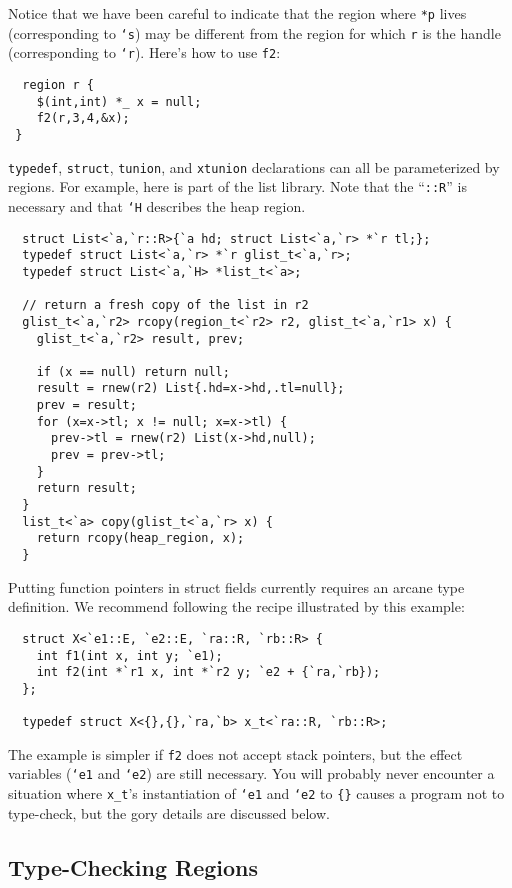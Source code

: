 Notice that we have been careful to indicate that the region where
\texttt{*p} lives (corresponding to \texttt{`s}) may be different from
the region for which \texttt{r} is the handle (corresponding to
\texttt{`r}).  Here's how to use \texttt{f2}:
\begin{verbatim}
  region r { 
    $(int,int) *_ x = null; 
    f2(r,3,4,&x);
 }
\end{verbatim} %

\texttt{typedef}, \texttt{struct}, \texttt{tunion}, and
\texttt{xtunion} declarations can all be parameterized by regions.
For example, here is part of the list library.  Note that the
``\texttt{::R}'' is necessary and that \texttt{`H} describes the heap
region.
\begin{verbatim}
  struct List<`a,`r::R>{`a hd; struct List<`a,`r> *`r tl;};
  typedef struct List<`a,`r> *`r glist_t<`a,`r>;
  typedef struct List<`a,`H> *list_t<`a>;

  // return a fresh copy of the list in r2
  glist_t<`a,`r2> rcopy(region_t<`r2> r2, glist_t<`a,`r1> x) {
    glist_t<`a,`r2> result, prev;

    if (x == null) return null;
    result = rnew(r2) List{.hd=x->hd,.tl=null};
    prev = result;
    for (x=x->tl; x != null; x=x->tl) {
      prev->tl = rnew(r2) List(x->hd,null);
      prev = prev->tl;
    }
    return result;
  } 
  list_t<`a> copy(glist_t<`a,`r> x) {
    return rcopy(heap_region, x);
  }
\end{verbatim}

Putting function pointers in struct fields currently requires an
arcane type definition.  We recommend following the recipe illustrated
by this example:
\begin{verbatim}
  struct X<`e1::E, `e2::E, `ra::R, `rb::R> {
    int f1(int x, int y; `e1); 
    int f2(int *`r1 x, int *`r2 y; `e2 + {`ra,`rb});
  };

  typedef struct X<{},{},`ra,`b> x_t<`ra::R, `rb::R>;
\end{verbatim}

The example is simpler if \texttt{f2} does not accept stack pointers,
but the effect variables (\texttt{`e1} and \texttt{`e2}) are still
necessary.  You will probably never encounter a situation where
\texttt{x_t}'s instantiation of \texttt{`e1} and \texttt{`e2} to \verb|{}|
causes a program not to type-check, but the gory details are discussed
below.

\subsection{Type-Checking Regions}

